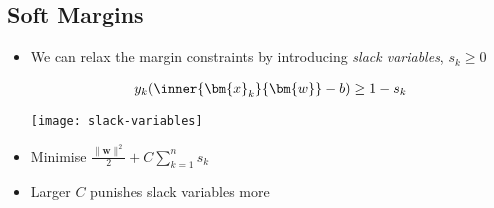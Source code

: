 
\begin{slide}
\section[-2]{Soft Margins}

\begin{PauseHighLight}
  \begin{itemize}
  \item We can relax the margin constraints by introducing \textit{slack
      variables}, $s_k\geq0$
    
    \begin{minipage}{10cm}
    \begin{align*}
      y_k (\inner{\bm{x}_k}{\bm{w}} - b) \geq 1-s_k
    \end{align*}
    \end{minipage}\hfil%
    \begin{minipage}{11cm}
    \begin{center}
      \texttt{[image: slack-variables]}\pause
    \end{center}
    \end{minipage}
  \item Minimise $\frac{\|\bm{w}\|^2}{2} + C \sum_{k=1}^n s_k$\pause
  \item Larger $C$ punishes slack variables more\pause
  \end{itemize}
\end{PauseHighLight}

\end{slide}


